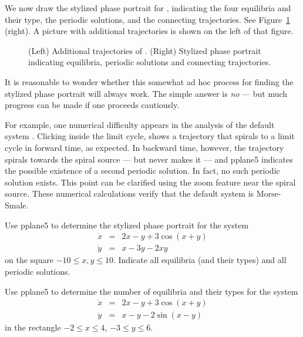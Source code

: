 \documentclass{ximera}
\begin{document}
We now draw the stylized phase portrait
 for ,
indicating the four equilibria and their type, the periodic
solutions, and the connecting trajectories. See
Figure~\ref{F:default2} (right).  A picture with additional 
trajectories is shown on the left of that figure.

\begin{figure}[htb]
           \centerline{%
		}
           \caption{(Left) Additional trajectories of 
\protect{}. (Right) Stylized phase portrait
indicating equilibria, periodic solutions and connecting trajectories.}
           \label{F:default2}
\end{figure}

It is reasonable to wonder whether this somewhat ad hoc process
for finding the stylized phase portrait will always work.  The
simple answer is {\em no} --- but much progress can be made if
one proceeds cautiously.  

For example, one numerical difficulty appears in the analysis of
the default system .  Clicking inside the limit
cycle, shows a trajectory that spirals to a limit cycle in
forward time, as expected. In backward time, however, the
trajectory spirals towards the spiral source --- but never makes
it --- and {\sf pplane5} indicates the possible existence of a
second periodic solution.  In fact, no such periodic solution
exists. This point can be clarified using the zoom feature near
the spiral source.  These numerical calculations verify that the 
default system  is Morse-Smale.

\EXER

\CEXER

\begin{exercise} \label{c8.4.1}
Use {\sf pplane5} to determine the stylized phase portrait for 
the system
\begin{equation*}
\begin{array}{rcl}
\dot{x} & = &  2x-y+3\cos(x+y)  \\
\dot{y} & = &  x -3y -2xy
\end{array}
\end{equation*}
on the square $-10 \leq x,y \leq 10$.  Indicate all equilibria
(and their types) and all periodic solutions.
\end{exercise}  

\begin{exercise} \label{c8.4.2}
Use {\sf pplane5} to determine the number of equilibria and their
types for the system
\begin{equation*}
\begin{array}{rcl}
\dot{x} & = &  2x-y+3\cos(x+y)  \\
\dot{y} & = &  x -y -2\sin(x-y)
\end{array}
\end{equation*}
in the rectangle $-2 \leq x \leq 4$, $-3 \leq y \leq 6$.  
\end{exercise}  
\end{document}

